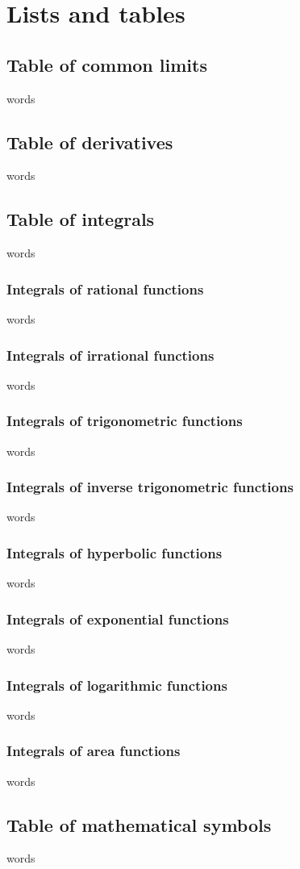 \chapter{Lists and tables}


\section{Table of common limits}
words

\section{Table of derivatives}
words

\section{Table of integrals}
words

\subsection{Integrals of rational functions}
words

\subsection{Integrals of irrational functions}
words

\subsection{Integrals of trigonometric functions}
words

\subsection{Integrals of inverse trigonometric functions}
words

\subsection{Integrals of hyperbolic functions}
words

\subsection{Integrals of exponential functions}
words

\subsection{Integrals of logarithmic functions}
words

\subsection{Integrals of area functions}
words

\section{Table of mathematical symbols}
words





